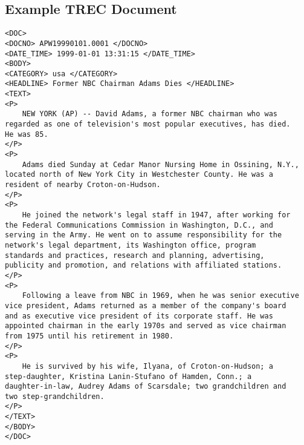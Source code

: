 \begin{appendices}
\chapter{Example TREC Document}
\label{sec:exampleDoc}
\small\begin{verbatim}
<DOC>
<DOCNO> APW19990101.0001 </DOCNO>
<DATE_TIME> 1999-01-01 13:31:15 </DATE_TIME>
<BODY>
<CATEGORY> usa </CATEGORY>
<HEADLINE> Former NBC Chairman Adams Dies </HEADLINE>
<TEXT>
<P>
	NEW YORK (AP) -- David Adams, a former NBC chairman who was
regarded as one of television's most popular executives, has died.
He was 85.
</P>
<P>
	Adams died Sunday at Cedar Manor Nursing Home in Ossining, N.Y.,
located north of New York City in Westchester County. He was a
resident of nearby Croton-on-Hudson.
</P>
<P>
	He joined the network's legal staff in 1947, after working for
the Federal Communications Commission in Washington, D.C., and
serving in the Army. He went on to assume responsibility for the
network's legal department, its Washington office, program
standards and practices, research and planning, advertising,
publicity and promotion, and relations with affiliated stations.
</P>
<P>
	Following a leave from NBC in 1969, when he was senior executive
vice president, Adams returned as a member of the company's board
and as executive vice president of its corporate staff. He was
appointed chairman in the early 1970s and served as vice chairman
from 1975 until his retirement in 1980.
</P>
<P>
	He is survived by his wife, Ilyana, of Croton-on-Hudson; a
step-daughter, Kristina Lanin-Stufano of Hamden, Conn.; a
daughter-in-law, Audrey Adams of Scarsdale; two grandchildren and
two step-grandchildren.
</P>
</TEXT>
</BODY>
</DOC>
\end{verbatim}
\end{appendices}
